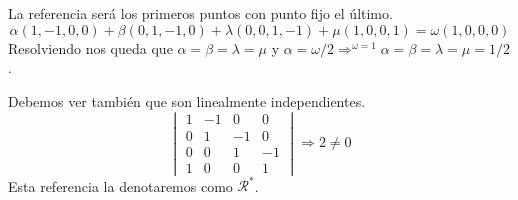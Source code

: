 \documentclass[10pt,a4paper,openright]{book}
\theoremstyle{break}
\begin{document}
La referencia será los primeros puntos con punto fijo el último.
\[
\alpha\left( 1, -1, 0, 0 \right) + \beta\left( 0, 1, -1, 0 \right) + \lambda\left( 0, 0, 1, -1 \right) + \mu\left( 1, 0, 0, 1 \right) = \omega\left( 1, 0, 0, 0 \right) 
\]
Resolviendo nos queda que $\alpha = \beta = \lambda = \mu$ y $\alpha = \omega/2 \Rightarrow^{\omega = 1} \alpha = \beta = \lambda = \mu = 1/2$.

Debemos ver también que son linealmente independientes.
\[
    \begin{vmatrix} 1 & -1 & 0 & 0\\ 0 & 1 & -1 & 0\\ 0 & 0 & 1 & -1\\ 1 & 0 & 0 & 1
    \end{vmatrix} \Rightarrow 2 \neq 0
\]
Esta referencia la denotaremos como $\mathcal{R}^*$.
\end{document}
